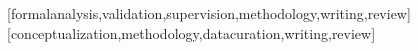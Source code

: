 \documentclass[portuguese]{textolivre}
\begin{document}
\printbibliography\label{sec-bib}


\begin{contributors}
[formalanalysis,validation,supervision,methodology,writing,review]
[conceptualization,methodology,datacuration,writing,review]
\end{contributors}
\end{document}
